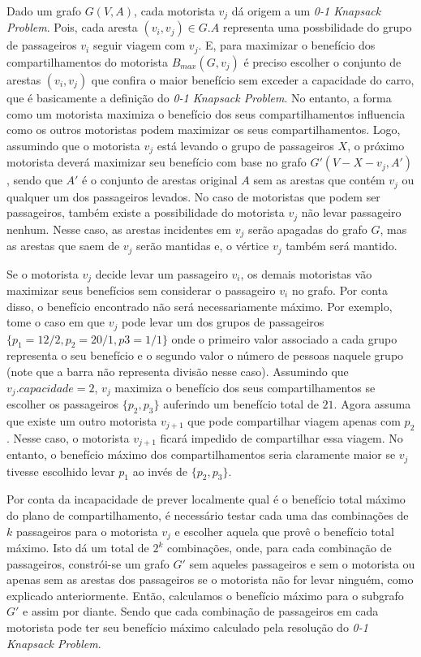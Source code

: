 \documentclass{article}
\begin{document}
Dado um grafo $ G(V,A)$, cada motorista $ v_j $ dá origem a um \textit{0-1 Knapsack Problem}. Pois, cada aresta $ (v_i, v_j) \in G.A $
representa uma possbilidade do grupo de passageiros $ v_i $ seguir viagem com $ v_j $. E, para maximizar o benefício dos
compartilhamentos do motorista $ B_{max}(G, v_j) $ é preciso escolher o conjunto de arestas $ (v_i, v_j) $ que confira o maior benefício
sem exceder a capacidade do carro, que é basicamente a definição do \textit{0-1 Knapsack Problem}. No entanto, a forma como 
um motorista maximiza o benefício dos seus compartilhamentos influencia como os outros motoristas podem
maximizar os seus compartilhamentos. Logo, assumindo que o motorista $ v_j $ está levando o grupo de passageiros $ X $, o próximo
motorista deverá maximizar seu benefício com base no grafo $ G'(V - X - v_j, A') $, sendo que $ A' $ é o conjunto de arestas original 
$ A $ sem as arestas que contém $ v_j $ ou qualquer um dos passageiros levados. No caso de motoristas que podem ser passageiros,
também existe a possibilidade do motorista $ v_j $ não levar passageiro nenhum. Nesse caso, as arestas incidentes em $ v_j $
serão apagadas do grafo $ G $, mas as arestas que saem de $ v_j $ serão mantidas e, o vértice $ v_j $ também será mantido.

Se o motorista $ v_j $ decide levar um passageiro $ v_i $, os demais motoristas vão maximizar seus benefícios sem considerar o 
passageiro $ v_i $ no grafo. Por conta disso, o benefício encontrado não será necessariamente máximo. Por exemplo, tome o caso em que
$ v_j $ pode levar um dos grupos de passageiros $ \{ p_1 = 12/2, p_2 = 20/1, p3 = 1/1 \} $ onde o primeiro valor associado a cada grupo representa o seu benefício
e o segundo valor o número de pessoas naquele grupo (note que a barra não representa divisão nesse caso).
Assumindo que $ v_j.capacidade = 2 $, $ v_j $ maximiza o benefício dos seus compartilhamentos se escolher os passageiros $ \{ p_2, p_3 \} $ auferindo um
benefício total de $ 21 $. Agora assuma que existe um outro motorista $ v_{j+1} $ que pode compartilhar viagem apenas com $ p_2 $. Nesse caso,
o motorista $ v_{j+1} $ ficará impedido de compartilhar essa viagem. No entanto, o benefício máximo dos compartilhamentos seria claramente 
maior se $ v_j $ tivesse escolhido levar $ p_1 $ ao invés de $ \{ p_2, p_3 \} $. 

Por conta da incapacidade de prever localmente qual é o benefício total máximo do plano de compartilhamento, é necessário testar 
cada uma das combinações de $ k $ passageiros para o motorista $ v_j $ e escolher aquela que provê o benefício total máximo.
Isto dá um total de $ 2^k $ combinações, onde, para cada combinação de passageiros, constrói-se um grafo $ G' $ sem aqueles passageiros
e sem o motorista ou apenas sem as arestas dos passageiros se o motorista não for levar ninguém, como explicado anteriormente. 
Então, calculamos o benefício máximo para o subgrafo $ G' $ e assim por diante. Sendo que cada combinação de passageiros em 
cada motorista pode ter seu benefício máximo calculado pela resolução do \textit{0-1 Knapsack Problem}.
\end{document}
